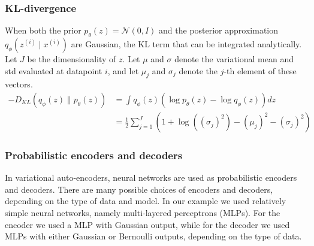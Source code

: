 \subsubsection*{KL-divergence}
When both the prior $p_{\theta}(z)=\mathcal{N} (0, I)$ and the posterior approximation $q_{\phi} \left(z^{(i)} \mid x^{(i)}\right)$ are Gaussian, the KL term that can be integrated analytically. Let $J$ be the dimensionality of $z$. Let $\mu$ and $\sigma$ denote the variational mean and std evaluated at datapoint $i$, and let $\mu_{j}$ and $\sigma_{j}$ denote the $j$-th element of these vectors.
\begin{equation*}
\begin{aligned}
-D_{KL}\left(q_{\phi}(z) \| p_{\theta}(z)\right)
&=\int q_{\phi}(z)\left(\log p_{\theta}(z)-\log q_{\phi}(z)\right) dz \\
&=\frac{1}{2} \sum_{j=1}^{J}\left(1+\log \left(\left(\sigma_{j}\right)^{2}\right)-\left(\mu_{j}\right)^{2}-\left(\sigma_{j}\right)^{2}\right)
\end{aligned}
\end{equation*}

\subsubsection*{Probabilistic encoders and decoders}
In variational auto-encoders, neural networks are used as probabilistic encoders and decoders. There are many possible choices of encoders and decoders, depending on the type of data and model. In our example we used relatively simple neural networks, namely multi-layered perceptrons (MLPs). For the encoder we used a MLP with Gaussian output, while for the decoder we used MLPs with either Gaussian or Bernoulli outputs, depending on the type of data.
